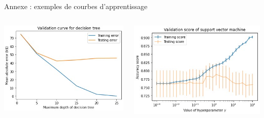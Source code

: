 \documentclass{beamer}
\begin{document}
\begin{frame}{Annexe : exemples de courbes d'apprentissage}
\begin{columns}[t]
    \begin{column}{0.49\textwidth}
        \centering
        \includegraphics[width=\textwidth]{images/validation_curves.jpg}
    \end{column}
    \begin{column}{0.49\textwidth}
        \centering
        \includegraphics[width=\textwidth]{images/validation_score.jpg}
    \end{column}
\end{columns}
\end{frame}
\end{document}
